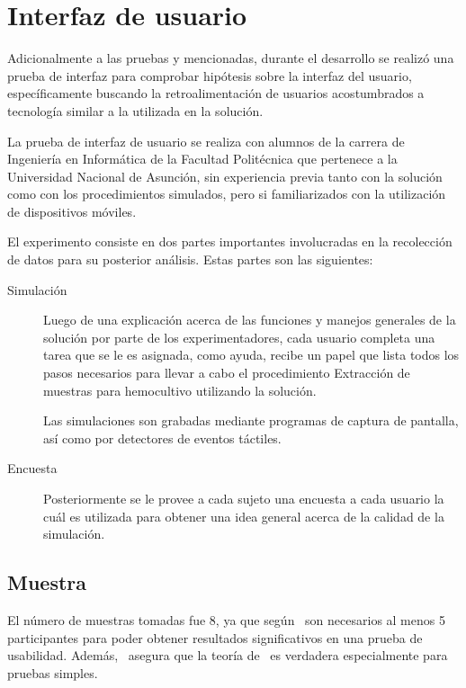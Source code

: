 \section{Interfaz de usuario}
\label{sec:interfaz}

Adicionalmente a las pruebas y mencionadas, durante el desarrollo se realizó una
prueba de interfaz para comprobar hipótesis sobre la interfaz del usuario,
específicamente buscando la retroalimentación de usuarios acostumbrados a
tecnología similar a la utilizada en la solución.

La prueba de interfaz de usuario se realiza con alumnos de la carrera de
Ingeniería en Informática de la Facultad Politécnica que pertenece a la
Universidad Nacional de Asunción, sin experiencia
previa tanto con la solución como con los procedimientos simulados, pero si
familiarizados con la utilización de dispositivos móviles.

El experimento consiste en dos partes importantes involucradas en la recolección
de datos para su posterior análisis. Estas partes son las siguientes:

\begin{description}

\item[Simulación] Luego de una explicación acerca de las funciones y manejos
    generales de la solución por parte de los experimentadores, cada usuario
    completa una tarea que se le es asignada, como ayuda, recibe un papel que
    lista todos los pasos necesarios para llevar a cabo el procedimiento
    Extracción de muestras para hemocultivo utilizando la solución.
    	
    Las simulaciones son grabadas mediante programas de captura de pantalla, así
    como por detectores de eventos táctiles.
    	
\item[Encuesta] Posteriormente se le provee a cada sujeto una encuesta a cada
    usuario la cuál es utilizada para obtener una idea general acerca de la
    calidad de la simulación. 

\end{description} 

\subsection{Muestra}

El número de muestras tomadas fue 8, ya que según~\cite{nielsen2000} son necesarios
al menos 5 participantes para poder obtener resultados significativos en una prueba
de usabilidad. Además,~\cite{ritch2009} asegura que la teoría de~\cite{nielsen2000}
es verdadera especialmente para pruebas simples. 

